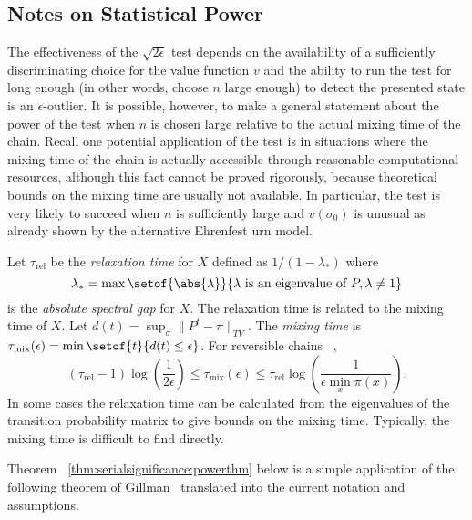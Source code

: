 \documentclass[12pt]{article}
\begin{document}
\subsection*{Notes on Statistical Power}

The effectiveness of the \( \sqrt{2\epsilon} \) test depends on the
availability of a sufficiently discriminating choice for the value
function \( v \) and the ability to run the test for long enough (in
other words, choose \( n \) large enough) to detect the presented state
is an \( \epsilon \)-outlier.  It is possible, however, to make a
general statement about the power of the test when \( n \) is chosen
large relative to the actual mixing time of the chain.  Recall one
potential application of the test is in situations where the mixing time
of the chain is actually accessible through reasonable computational
resources, although this fact cannot be proved rigorously, because
theoretical bounds on the mixing time are usually not available.  In
particular, the test is very likely to succeed when \( n \) is
sufficiently large and \( v(\sigma_0) \) is unusual as already shown by
the alternative Ehrenfest urn model.

\begin{remark}
    Let \( \tau_{\text{rel}} \) be the \emph{relaxation time}%
    for \( X \) defined as \( 1/ (1-\lambda_*) \) where
    \[
        \lambda_* = \max \setof{\abs{\lambda}}{ \lambda \text{ is an
        eigenvalue of } P, \lambda \ne 1 }
    \] is the \emph{absolute spectral gap} for \( X \).  The relaxation
    time is related to the mixing time of \( X \).  Let \( d(t) = \sup_{\sigma}
    \| P^t - \pi \|_{TV} \).  The \emph{mixing time} is \( \tau_{\text{mix}}
    (\epsilon) = \min\setof{t}{d(t) \le \epsilon} \).  For reversible
    chains~%
    \cite[Theorems 12.3, 12.4]{levin09},
    \[
        (\tau_{\text{rel}}-1) \log \left( \frac{1}{2\epsilon} \right)
        \le \tau_{\text{mix}}(\epsilon) \le \tau_{\text{rel}} \log
        \left(\frac{1} {\epsilon \min_x \pi(x)} \right).
    \] In some cases the relaxation time can be calculated from the
    eigenvalues of the transition probability matrix to give bounds on
    the mixing time.  Typically, the mixing time is difficult to find
    directly.
\end{remark}

Theorem~%
\ref{thm:serialsignificance:powerthm} below is a simple application of
the following theorem of Gillman~%
\cite[Theorem 2.1]{gillman98} translated into the current notation and
assumptions.
\end{document}
